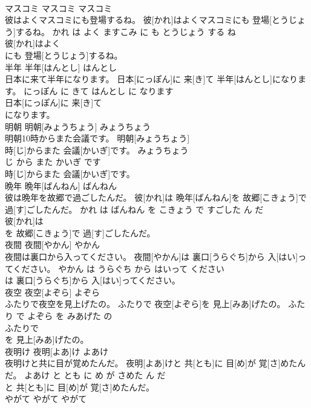 \documentclass[8pt]{extreport}
\begin{document}
\begin{CJK}{UTF8}{min}
\\	マスコミ	マスコミ	マスコミ	
\\	彼はよくマスコミにも登場するね。	彼[かれ]はよくマスコミにも 登場[とうじょう]するね。	かれ は よく ますこみ に も とうじょう する ね	
\\	彼[かれ]はよく
\\	にも 登場[とうじょう]するね。			
\\	半年	半年[はんとし]	はんとし	
\\	日本に来て半年になります。	日本[にっぽん]に 来[き]て 半年[はんとし]になります。	にっぽん に きて はんとし に なります	
\\	日本[にっぽん]に 来[き]て
\\	になります。			
\\	明朝	明朝[みょうちょう]	みょうちょう	
\\	明朝10時からまた会議です。	明朝[みょうちょう] 
\\	時[じ]からまた 会議[かいぎ]です。	みょうちょう 
\\	じ から また かいぎ です	
\\	時[じ]からまた 会議[かいぎ]です。			
\\	晩年	晩年[ばんねん]	ばんねん	
\\	彼は晩年を故郷で過ごしたんだ。	彼[かれ]は 晩年[ばんねん]を 故郷[こきょう]で 過[す]ごしたんだ。	かれ は ばんねん を こきょう で すごした ん だ	
\\	彼[かれ]は
\\	を 故郷[こきょう]で 過[す]ごしたんだ。			
\\	夜間	夜間[やかん]	やかん	
\\	夜間は裏口から入ってください。	夜間[やかん]は 裏口[うらぐち]から 入[はい]ってください。	やかん は うらぐち から はいって ください	
\\	は 裏口[うらぐち]から 入[はい]ってください。			
\\	夜空	夜空[よぞら]	よぞら	
\\	ふたりで夜空を見上げたの。	ふたりで 夜空[よぞら]を 見上[みあ]げたの。	ふたり で よぞら を みあげた の	
\\	ふたりで
\\	を 見上[みあ]げたの。			
\\	夜明け	夜明[よあ]け	よあけ	
\\	夜明けと共に目が覚めたんだ。	夜明[よあ]けと 共[とも]に 目[め]が 覚[さ]めたんだ。	よあけ と とも に め が さめた ん だ	
\\	と 共[とも]に 目[め]が 覚[さ]めたんだ。			
\\	やがて	やがて	やがて	

\end{CJK}
\end{document}
